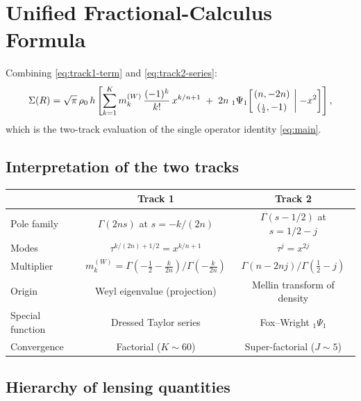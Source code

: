 \documentclass{article}
\begin{document}
\section{Unified Fractional-Calculus Formula}
\label{sec:unified}

Combining \eqref{eq:track1-term} and \eqref{eq:track2-series}:
\begin{equation}\label{eq:full-series}
\Sigma(R) = \sqrt{\pi}\,\rho_0\,h\left[
\sum_{k=1}^K m_k^{(W)}\,\frac{(-1)^k}{k!}\,x^{k/n+1}
\;+\; 2n\;{}_1\Psi_1\!\left[
\genfrac{}{}{0pt}{}{(n,-2n)}{({\scriptstyle\frac12},-1)}
\;\bigg|\;{-}x^2\right]
\right],
\end{equation}
which is the two-track evaluation of the single operator identity
\eqref{eq:main}.

\subsection{Interpretation of the two tracks}

\begin{center}
\renewcommand{\arraystretch}{1.6}
\begin{tabular}{lcc}
\toprule
& \textbf{Track 1} & \textbf{Track 2}\\
\midrule
Pole family & $\Gamma(2ns)$ at $s=-k/(2n)$ & $\Gamma(s-1/2)$ at $s=1/2-j$\\
Modes & $\tau^{k/(2n)+1/2} = x^{k/n+1}$ & $\tau^j = x^{2j}$\\
Multiplier & $m_k^{(W)} = \Gamma(-\frac12-\frac{k}{2n})/\Gamma(-\frac{k}{2n})$ & $\Gamma(n-2nj)/\Gamma(\frac12-j)$\\
Origin & Weyl eigenvalue (projection) & Mellin transform of density\\
Special function & Dressed Taylor series & Fox--Wright ${}_1\Psi_1$\\
Convergence & Factorial ($K\sim60$) & Super-factorial ($J\sim5$)\\
\bottomrule
\end{tabular}
\end{center}

\subsection{Hierarchy of lensing quantities}
\end{document}
